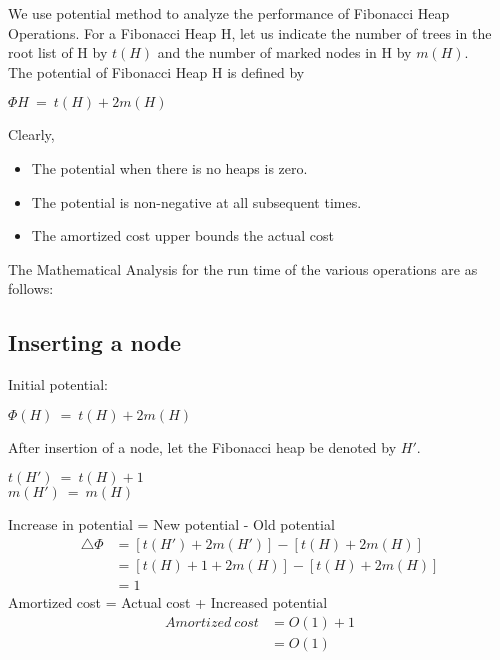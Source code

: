 We use potential method to analyze the performance of Fibonacci Heap Operations. For a Fibonacci Heap H, let us indicate the number of trees in the root list of H by $t(H)$ and the number of marked nodes in H by $m(H)$. \\ The potential of Fibonacci Heap H is defined by \\
\begin{center}
	$\Phi{H} \ = \ t(H) + 2m(H)$
\end{center}
Clearly,
\begin{itemize}
	\item The potential when there is no heaps is zero.
	\item The potential is non-negative at all subsequent times.
	\item The amortized cost upper bounds the actual cost
\end{itemize}

The Mathematical Analysis for the run time of the various operations are as follows:

\subsection{Inserting a node}
Initial potential:
\begin{center}
	$\Phi{(H)} \ = \ t(H) + 2m(H)$
\end{center}
After insertion of a node, let the Fibonacci heap be denoted by $H'$.
\begin{center}
$t(H') \ = \ t(H) + 1$ \\
$m(H') \ = \ m(H)$ \\
\end{center}
Increase in potential = New potential - Old potential
\begin{equation}
	\begin{split}
		\triangle{\Phi} &= [t(H')+2m(H')] - [t(H)+2m(H)]
		\\&= [t(H) + 1 + 2m(H)] - [t(H)+2m(H)]
		\\&= 1
	\end{split}
\end{equation}
Amortized cost = Actual cost + Increased potential
\begin{equation}
\begin{split}
Amortized \ cost &= O(1) + 1
\\&= O(1)
\end{split}
\end{equation}

